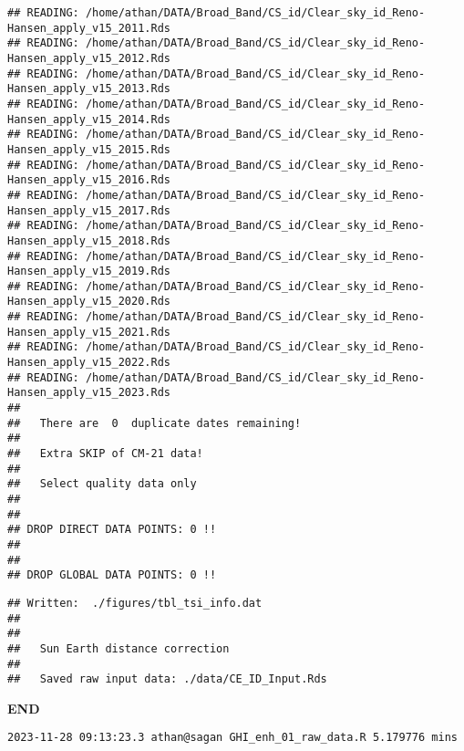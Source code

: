 \documentclass[
  10pt,
  a4paper,oneside]{article}
\begin{document}
\begin{verbatim}
## READING: /home/athan/DATA/Broad_Band/CS_id/Clear_sky_id_Reno-Hansen_apply_v15_2011.Rds 
## READING: /home/athan/DATA/Broad_Band/CS_id/Clear_sky_id_Reno-Hansen_apply_v15_2012.Rds 
## READING: /home/athan/DATA/Broad_Band/CS_id/Clear_sky_id_Reno-Hansen_apply_v15_2013.Rds 
## READING: /home/athan/DATA/Broad_Band/CS_id/Clear_sky_id_Reno-Hansen_apply_v15_2014.Rds 
## READING: /home/athan/DATA/Broad_Band/CS_id/Clear_sky_id_Reno-Hansen_apply_v15_2015.Rds 
## READING: /home/athan/DATA/Broad_Band/CS_id/Clear_sky_id_Reno-Hansen_apply_v15_2016.Rds 
## READING: /home/athan/DATA/Broad_Band/CS_id/Clear_sky_id_Reno-Hansen_apply_v15_2017.Rds 
## READING: /home/athan/DATA/Broad_Band/CS_id/Clear_sky_id_Reno-Hansen_apply_v15_2018.Rds 
## READING: /home/athan/DATA/Broad_Band/CS_id/Clear_sky_id_Reno-Hansen_apply_v15_2019.Rds 
## READING: /home/athan/DATA/Broad_Band/CS_id/Clear_sky_id_Reno-Hansen_apply_v15_2020.Rds 
## READING: /home/athan/DATA/Broad_Band/CS_id/Clear_sky_id_Reno-Hansen_apply_v15_2021.Rds 
## READING: /home/athan/DATA/Broad_Band/CS_id/Clear_sky_id_Reno-Hansen_apply_v15_2022.Rds 
## READING: /home/athan/DATA/Broad_Band/CS_id/Clear_sky_id_Reno-Hansen_apply_v15_2023.Rds 
## 
##   There are  0  duplicate dates remaining!
## 
##   Extra SKIP of CM-21 data!
## 
##   Select quality data only
## 
## 
## DROP DIRECT DATA POINTS: 0 !!
## 
## 
## DROP GLOBAL DATA POINTS: 0 !!
\end{verbatim}

\begin{verbatim}
## Written:  ./figures/tbl_tsi_info.dat 
## 
## 
##   Sun Earth distance correction
## 
##   Saved raw input data: ./data/CE_ID_Input.Rds
\end{verbatim}

\textbf{END}

\begin{verbatim}
2023-11-28 09:13:23.3 athan@sagan GHI_enh_01_raw_data.R 5.179776 mins
\end{verbatim}
\end{document}
